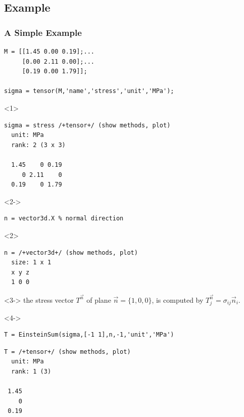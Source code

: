 \documentclass[compress]{beamer}
\begin{document}
\subsection*{Example}

\begin{frame}[fragile]
  \frametitle{A Simple Example}

  \begin{overlayarea}{\textwidth}{\textheight}

    \vspace{-.3cm}
  \begin{lstlisting}[style=input]
M = [[1.45 0.00 0.19];...
     [0.00 2.11 0.00];...
     [0.19 0.00 1.79]];

sigma = tensor(M,'name','stress','unit','MPa');
\end{lstlisting}
  \vspace{-.3cm}
\begin{onlyenv}<1>
  \begin{lstlisting}[style=output]
sigma = stress /+tensor+/ (show methods, plot)
  unit: MPa
  rank: 2 (3 x 3)

  1.45    0 0.19
     0 2.11    0
  0.19    0 1.79
  \end{lstlisting}
\end{onlyenv}

\medskip
\begin{onlyenv}<2->
\begin{lstlisting}[style=input]
n = vector3d.X % normal direction
\end{lstlisting}
  \vspace{-.3cm}
\end{onlyenv}
\begin{onlyenv}<2>
  \begin{lstlisting}[style=output]
n = /+vector3d+/ (show methods, plot)
  size: 1 x 1
  x y z
  1 0 0
  \end{lstlisting}
\end{onlyenv}

\bigskip

\begin{onlyenv}<3->
the stress vector $T^{\vec n}$ of plane $\vec n = \{1,0,0\}$, is computed by
$T^{\vec n}_{j} = \sigma_{ij} \vec n_{i}.$
\end{onlyenv}

\medskip

\begin{onlyenv}<4->
\begin{lstlisting}[style=input]
T = EinsteinSum(sigma,[-1 1],n,-1,'unit','MPa')
\end{lstlisting}
  \vspace{-.3cm}
\begin{lstlisting}[style=output]
T = /+tensor+/ (show methods, plot)
  unit: MPa
  rank: 1 (3)

 1.45
    0
 0.19
\end{lstlisting}
\end{onlyenv}
\end{overlayarea}

\end{frame}
\end{document}
